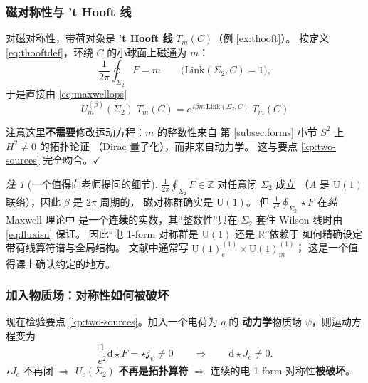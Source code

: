 \documentclass[UTF8,a4paper,11pt]{ctexart}
\theoremstyle{plain}
\theoremstyle{definition}
\theoremstyle{remark}
\newtheorem{remark}{注}[section]
\newcommand{\ext}{\mathrm{d}}          %
\newcommand{\hs}{\star}                %
\newcommand{\Link}{\mathrm{Link}}
\newcommand{\ZZ}{\mathbb{Z}}
\newcommand{\RR}{\mathbb{R}}
\newcommand{\Uone}{\mathrm{U}(1)}
\newcommand{\Ssurf}{\Sigma}
\newcommand{\Uop}{U}
\begin{document}
\subsubsection{磁对称性与 't Hooft 线}
\label{subsec:tHooft-line}

对磁对称性，带荷对象是 \textbf{'t Hooft 线} $T_m(C)$（例 \ref{ex:thooft}）。
按定义 \eqref{eq:thooftdef}，环绕 $C$ 的小球面上磁通为 $m$：
\begin{equation}
  \frac{1}{2\pi}\oint_{\Ssurf_2}F=m\qquad
  \big(\Link(\Ssurf_2,C)=1\big),
\end{equation}
于是直接由 \eqref{eq:maxwellops}
\begin{equation}
  \boxed{\
  \Uop_m^{(\beta)}(\Ssurf_2)\;T_m(C)
  =e^{\,i\beta m\,\Link(\Ssurf_2,C)}\;T_m(C)\ }
  \label{eq:UmonT}
\end{equation}

注意这里\textbf{不需要}修改运动方程：$m$ 的整数性来自
第 \ref{subsec:forms} 小节 $S^2$ 上 $H^2\ne0$ 的拓扑论证
（Dirac 量子化），而非来自动力学。
这与要点 \ref{kp:two-sources} 完全吻合。$\checkmark$

\begin{remark}[一个值得向老师提问的细节]
$\frac{1}{2\pi}\oint_{\Ssurf_2}F\in\ZZ$ 对任意闭 $\Ssurf_2$ 成立
（$A$ 是 $\Uone$ 联络），因此 $\beta$ 是 $2\pi$ 周期的，
磁对称群确实是 $\Uone$。
但 $\frac{1}{e^2}\oint_{\Ssurf_2}\hs F$ 在\emph{纯} Maxwell 理论中
是一个\textbf{连续}的实数，其“整数性”只在 $\Ssurf_2$ 套住
Wilson 线时由 \eqref{eq:fluxisn} 保证。
因此“电 1-form 对称群是 $\Uone$ 还是 $\RR$”依赖于
如何精确设定带荷线算符谱与全局结构。
文献中通常写 $\Uone_e^{(1)}\times\Uone_m^{(1)}$；
这是一个值得课上确认约定的地方。
\end{remark}

\subsubsection{加入物质场：对称性如何被破坏}
\label{subsec:matter}

现在检验要点 \ref{kp:two-sources}。加入一个电荷为 $q$ 的
\textbf{动力学}物质场 $\psi$，则运动方程变为
\begin{equation}
  \frac{1}{e^2}\ext\hs F=\hs j_\psi\ne0
  \qquad\Longrightarrow\qquad
  \ext\hs J_e\ne0 .
  \label{eq:brokenEOM}
\end{equation}
$\hs J_e$ 不再闭 $\Rightarrow$ $\Uop_e(\Ssurf_2)$ \textbf{不再是拓扑算符}
$\Rightarrow$ 连续的电 1-form 对称性\textbf{被破坏}。
\end{document}
